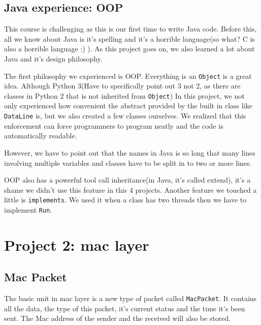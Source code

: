 \documentclass[conference,compsoc]{IEEEtran}
\begin{document}
	\subsection{Java experience: OOP}
		This course is challenging as this is our first time to write Java code.
		Before this, all we know about Java is it's spelling and it's a horrible language(so what? C is also a horrible language :) ).
		As this project goes on, we also learned a lot about Java and it's design philosophy.
		\par
		The first philosophy we experienced is OOP. 
		Everything is an \lstinline{Object} is a great idea.
		Although Python 3(Have to specifically point out 3 not 2, as there are classes in Python 2 that is not inherited from \lstinline{Object})
		In this project, we not only experienced how convenient the abstract provided by the built in class like \lstinline{DataLine} is, but we also created a few classes ourselves.
		We realized that this enforcement can force programmers to program neatly and the code is automatically readable.
		\par
		However, we have to point out that the names in Java is so long that many lines involving multiple variables and classes have to be split in to two or more lines.
		\par
		OOP also has a powerful tool call inheritance(in Java, it's called extend), it's a shame we didn't use this feature in this 4 projects. 
		Another feature we touched a little is \lstinline{implements}.
		We used it when a class has two threads then we have to implement \lstinline{Run}.

\section{Project 2: mac layer}
	
	\subsection{Mac Packet}
		The basic unit in mac layer is a new type of packet called \lstinline{MacPacket}. 
		It contains all the data, the type of this packet, it's current status and the time it's been sent. 
		The Mac address of the sender and the received will also be stored.
\end{document}
